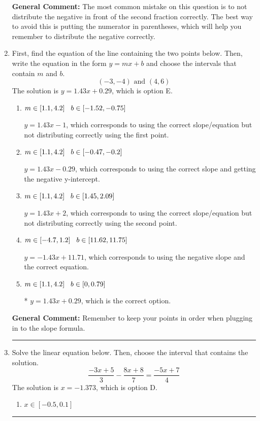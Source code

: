 \documentclass{extbook}[14pt]
\newcommand{\litem}[1]{\item #1

\rule{\textwidth}{0.4pt}}
\begin{document}
\begin{enumerate}
{\textbf{General Comment:} The most common mistake on this question is to not distribute the negative in front of the second fraction correctly. The best way to avoid this is putting the numerator in parentheses, which will help you remember to distribute the negative correctly.
}
\litem{
First, find the equation of the line containing the two points below. Then, write the equation in the form $ y=mx+b $ and choose the intervals that contain $m$ and $b$.
\[ (-3, -4) \text{ and } (4, 6) \]The solution is \( y = 1.43x + 0.29 \), which is option E.\begin{enumerate}[label=\Alph*.]
\item \( m \in [1.1, 4.2] \hspace*{3mm} b \in [-1.52, -0.75] \)

 $y = 1.43x -1$, which corresponds to using the correct slope/equation but not distributing correctly using the first point.
\item \( m \in [1.1, 4.2] \hspace*{3mm} b \in [-0.47, -0.2] \)

 $y = 1.43x -0.29$, which corresponds to using the correct slope and getting the negative y-intercept.
\item \( m \in [1.1, 4.2] \hspace*{3mm} b \in [1.45, 2.09] \)

 $y = 1.43x + 2$, which corresponds to using the correct slope/equation but not distributing correctly using the second point.
\item \( m \in [-4.7, 1.2] \hspace*{3mm} b \in [11.62, 11.75] \)

 $y = -1.43x + 11.71$, which corresponds to using the negative slope and the correct equation.
\item \( m \in [1.1, 4.2] \hspace*{3mm} b \in [0, 0.79] \)

* $y = 1.43x + 0.29$, which is the correct option.
\end{enumerate}

\textbf{General Comment:} Remember to keep your points in order when plugging in to the slope formula.
}
\litem{
Solve the linear equation below. Then, choose the interval that contains the solution.
\[ \frac{-3x + 5}{3} - \frac{8x + 8}{7} = \frac{-5x + 7}{4} \]The solution is \( x = -1.373 \), which is option D.\begin{enumerate}[label=\Alph*.]
\item \( x \in [-0.5, 0.1] \)


\end{enumerate}}
\end{enumerate}
\end{document}
